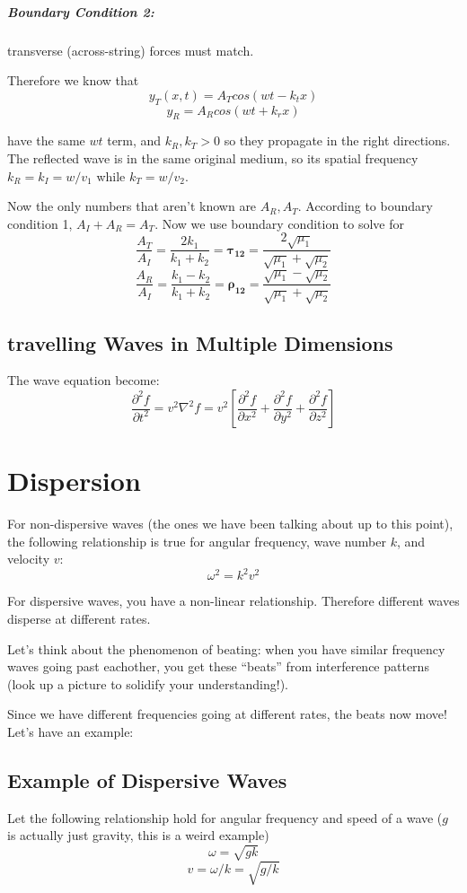 \documentclass[a4paper,12pt]{report}
\begin{document}
\paragraph{Boundary Condition 2: } transverse (across-string) forces must match.

Therefore we know that 
$$y_T(x, t) = A_T cos(wt - k_t x)$$ $$y_R = A_R cos (wt + k_r x)$$

have the same $wt$ term, and $k_R, k_T > 0$ so they propagate in the right directions. The reflected 
wave is in the same original medium, so its spatial frequency $k_R = k_I = w/v_1$ while $k_T = w/v_2$.

Now the only numbers that aren't known are $A_R, A_T$. According to boundary condition 1, $A_I + A_R = A_T$. 
Now we use boundary condition to solve for 
$$\frac{A_T}{A_I} = \frac{2k_1}{k_1+k_2} = \pmb{\tau_{12}} = \frac{2 \sqrt{\mu_1}}{\sqrt{\mu_1} + \sqrt{\mu_2}} $$ 
$$\frac{A_R}{A_I} = \frac{k_1 - k_2}{k_1 + k_2} = \pmb{\rho_{12}} = \frac{\sqrt{\mu_1} - \sqrt{\mu_2}}{\sqrt{\mu_1} + \sqrt{\mu_2}}$$

\section{travelling Waves in Multiple Dimensions}
The wave equation become: $$\frac{\partial^2 f}{\partial t^2} = v^2\nabla^2f = v^2[\frac{\partial^2 f}{\partial x^2} + \frac{\partial^2 f}{\partial y^2} + \frac{\partial^2 f}{\partial z^2}]$$

\chapter{Dispersion}
For non-dispersive waves (the ones we have been talking about up to this point), the following relationship is true for angular 
frequency, wave number $k$, and velocity $v$: $$\omega^2 = k^2v^2$$

For dispersive waves, you have a non-linear relationship. Therefore different waves disperse at different rates. 

Let's think about the phenomenon of beating: when you have similar frequency waves going past eachother, you get these ``beats'' from 
interference patterns (look up a picture to solidify your understanding!).

Since we have different frequencies going at different rates, the beats now move! Let's have an example: 

\section{Example of Dispersive Waves}
Let the following relationship hold for angular frequency and speed of a wave ($g$ is actually just gravity, this is a weird example)
$$\omega = \sqrt{gk}$$
$$v = \omega/k = \sqrt{g/k}$$
\end{document}
